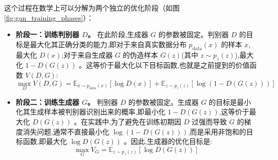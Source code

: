 \begin{itemize}
    这个过程在数学上可以分解为两个独立的优化阶段（如图 \ref{fig:gan_training_phases}）：
    \begin{itemize}
        \item \textbf{阶段一：训练判别器 $D$。} 在此阶段,生成器 $G$ 的参数被固定。判别器 $D$ 的目标是最大化其正确分类的能力,即对于来自真实数据分布 $p_{\text{data}}(x)$ 的样本 $x$,最大化 $D(x)$;对于来自生成器 $G$ 的伪造样本 $G(z)$(其中 $z \sim p_z(z)$),最大化 $1 - D(G(z))$ 。这等价于最大化以下目标函数,也就是之前提到的价值函数 $V(D,G)$:
        $$ \max_{D} V(D, G) = \mathbb{E}_{x \sim p_{\text{data}}(x)}[\log D(x)] + \mathbb{E}_{z \sim p_{z}(z)}[\log(1 - D(G(z)))] $$
        
        \item \textbf{阶段二：训练生成器 $G$。} 判别器 $D$ 的参数被固定。生成器 $G$ 的目标是最小化其生成样本被判别器识别出来的概率,即最小化 $1 - D(G(z))$,这等价于最大化 $D(G(z))$ 。在实践中,为了避免在训练初期因 $D$ 过强而导致 $G$ 的梯度消失问题,通常不直接最小化 $\log(1 - D(G(z)))$,而是采用非饱和的目标函数,即最大化 $\log D(G(z))$ 。因此,生成器的优化目标是:
        $$ \max_{G} V_G = \mathbb{E}_{z \sim p_{z}(z)}[\log D(G(z))] $$
    \end{itemize}
    

\end{itemize}
